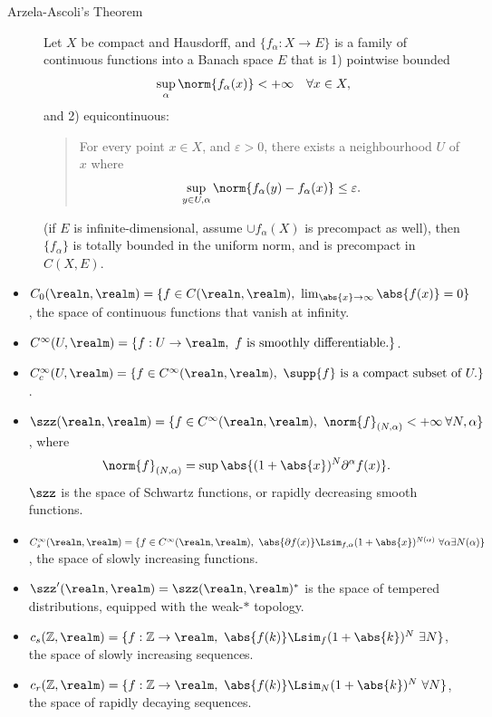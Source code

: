 \documentclass[../main-v2-manifolds.tex]{subfiles}
\begin{document}
\begin{description}
    \item[Arzela-Ascoli's Theorem]
    Let $X$ be compact and Hausdorff, and $\{f_{\alpha}: X\to E\}$ is a family of continuous functions into a Banach space $E$ that is 1) pointwise bounded
        \[\sup_{\alpha}\norm{f_{\alpha}(x)}<+\infty\quad\forall x\in X,\]
        and 2) equicontinuous:
        \begin{quote}
        For every point $x\in X$, and $\varepsilon>0$, there exists a neighbourhood $U$ of $x$ where
        \[
            \sup_{y\in U,\alpha}\norm{f_{\alpha}(y) - f_{\alpha}(x)}\leq \varepsilon.
        \]    
        \end{quote}
        (if $E$ is infinite-dimensional, assume $\cup f_{\alpha}(X)$ is precompact as well), then $\{f_{\alpha}\}$ is totally bounded in the uniform norm, and is precompact in $C(X,E)$.
\end{description}
\begin{itemize}
    \item $C_0(\realn,\realm) = \{f\in C(\realn,\realm),\  \lim_{\abs{x}\to\infty}\abs{f(x)}=0\}$, the space of continuous functions that vanish at infinity.
    \item $C^\infty(U,\realm) = \{f: U\to\realm,\  f\text{ is smoothly differentiable}.\}$.
    \item $C^\infty_c(U,\realm) = \{f\in C^\infty(\realn,\realm), \  \supp{f}\text{ is a compact subset of }U.\}$.
    \item $\szz(\realn,\realm) = \{f\in C^\infty(\realn,\realm),\  \norm{f}_{(N,\alpha)}<+\infty\: \forall N,\alpha\}$, where 
    \[
        \norm{f}_{(N,\alpha)} = \sup \abs{(1+\abs{x})^N\partial^\alpha f(x)}.
    \]
    $\szz$ is the space of Schwartz functions, or rapidly decreasing smooth functions.
    \item $C^\infty_s(\realn,\realm) = \{f\in C^\infty(\realn,\realm),\  \abs{\partial f(x)}\Lsim_{f,\alpha} (1+\abs{x})^{N(\alpha)}\ \forall\alpha\exists N(\alpha)\}$, the space of slowly increasing functions.
    \item $\szz'(\realn,\realm) = \szz(\realn,\realm)^\ast$ is the space of tempered distributions, equipped with the weak-$\ast$ topology.
    \item $c_s(\mathbb{Z},\realm) = \{f:\mathbb{Z}\to\realm,\ \abs{f(k)}\Lsim_{f}(1+\abs{k})^N\  \exists N\}$, the space of slowly increasing sequences. 
    \item $c_r(\mathbb{Z},\realm) = \{f:\mathbb{Z}\to\realm,\ \abs{f(k)}\Lsim_{N} (1+\abs{k})^{N}\ \forall N\}$, the space of rapidly decaying sequences.
\end{itemize}
\end{document}
